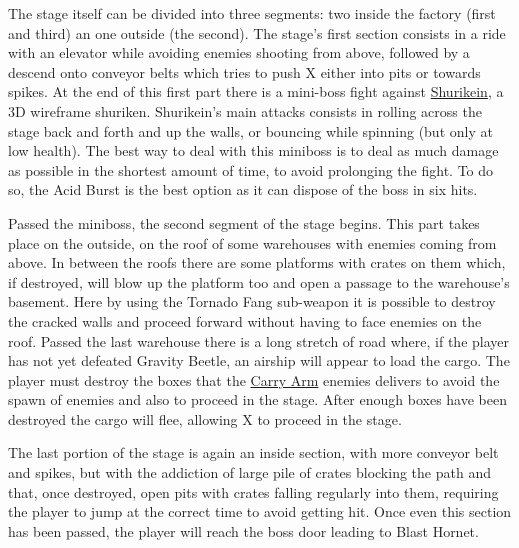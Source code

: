 The stage itself can be divided into three segments: two inside the factory (first and third) an one outside (the second). The stage's first section consists in a ride with an elevator while avoiding enemies shooting from above, followed by a descend onto conveyor belts which tries to push X either into pits or towards spikes. At the end of this first part there is a mini-boss fight against \hyperlink{miniboss:Shurikein}{Shurikein}, a 3D wireframe shuriken. Shurikein's main attacks consists in rolling across the stage back and forth and up the walls, or bouncing while spinning (but only at low health). The best way to deal with this miniboss is to deal as much damage as possible in the shortest amount of time, to avoid prolonging the fight. To do so, the Acid Burst is the best option as it can dispose of the boss in six hits. 

Passed the miniboss, the second segment of the stage begins. This part takes place on the outside, on the roof of some warehouses with enemies coming from above. In between the roofs there are some platforms with crates on them which, if destroyed, will blow up the platform too and open a passage to the warehouse's basement. Here by using  the Tornado Fang sub-weapon it is possible to destroy the cracked walls and proceed forward without having to face enemies on the roof. Passed the last warehouse there is a long stretch of road where, if the player has not yet defeated Gravity Beetle, an airship will appear to load the cargo. The player must destroy the boxes that the \hyperlink{enem:Carry_Arm}{Carry Arm} enemies delivers to avoid the spawn of enemies and also to proceed in the stage. After enough boxes have been destroyed the cargo will flee, allowing X to proceed in the stage.

The last portion of the stage is again an inside section, with more conveyor belt and spikes, but with the addiction of large pile of crates blocking the path and that, once destroyed, open pits with crates falling regularly into them, requiring the player to jump at the correct time to avoid getting hit. Once even this section has been passed, the player will reach the boss door leading to Blast Hornet.

